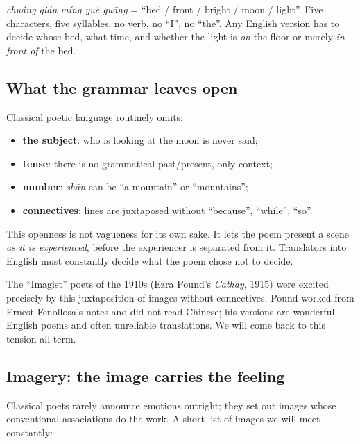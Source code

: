 \begin{example}[Counting]
 \emph{chuáng qián míng yuè guāng} = ``bed / front / bright / moon /
light''. Five characters, five syllables, no verb, no ``I'', no ``the''. Any English
version has to decide whose bed, what time, and whether the light is \emph{on} the floor
or merely \emph{in front of} the bed.
\end{example}

\subsection{What the grammar leaves open}

Classical poetic language routinely omits:
\begin{itemize}
  \item \textbf{the subject}: who is looking at the moon is never said;
  \item \textbf{tense}: there is no grammatical past/present, only context;
  \item \textbf{number}:  \emph{shān} can be ``a mountain'' or ``mountains'';
  \item \textbf{connectives}: lines are juxtaposed without ``because'', ``while'', ``so''.
\end{itemize}
This openness is not vagueness for its own sake. It lets the poem present a scene
\emph{as it is experienced}, before the experiencer is separated from it. Translators into
English must constantly decide what the poem chose not to decide.

\begin{aside}
The ``Imagist'' poets of the 1910s (Ezra Pound's \emph{Cathay}, 1915) were excited
precisely by this juxtaposition of images without connectives. Pound worked from Ernest
Fenollosa's notes and did not read Chinese; his versions are wonderful English poems and
often unreliable translations. We will come back to this tension all term.
\end{aside}

\subsection{Imagery: the image carries the feeling}

Classical poets rarely announce emotions outright; they set out images whose conventional
associations do the work. A short list of images we will meet constantly:

